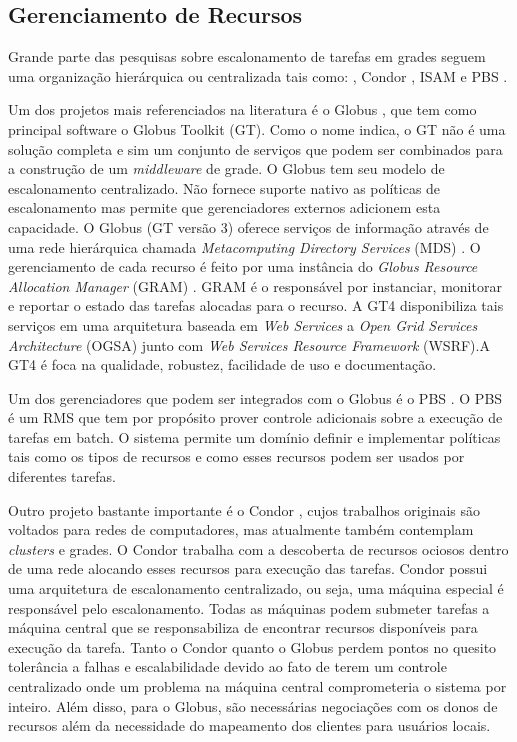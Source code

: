 \subsection{Gerenciamento de Recursos}
Grande parte das pesquisas sobre escalonamento de tarefas em grades seguem uma organização hierárquica ou centralizada tais como: \cite[Globus]{Foster1998}, Condor \cite{condor2007}, ISAM \cite{isam} e PBS \cite{Bayucan1998}.

Um dos projetos mais referenciados na literatura é o Globus \cite{Globus}, que tem como principal software o Globus Toolkit (GT). Como o nome indica, o GT não é uma solução completa e sim um conjunto de serviços que podem ser combinados para a construção de um \emph{middleware} de grade. O Globus \cite{Foster1998} tem seu modelo de escalonamento centralizado. Não fornece suporte nativo as políticas de escalonamento mas permite que gerenciadores externos adicionem esta capacidade. O Globus (GT versão 3) oferece serviços de informação através de uma rede hierárquica chamada \emph{Metacomputing Directory Services} (MDS) \cite{Santos}. O gerenciamento de cada recurso é feito por uma instância do {\it Globus Resource Allocation Manager} (GRAM) \cite{Andrade2002}. GRAM é o responsável por instanciar, monitorar e reportar o estado das tarefas alocadas para o recurso. A GT4 \cite{Leon2006} disponibiliza tais serviços em uma arquitetura baseada em {\it Web Services} a {\it Open Grid Services Architecture} (OGSA) junto com {\it Web Services Resource Framework} (WSRF).A GT4 é foca na qualidade, robustez, facilidade de uso e documentação.

Um dos gerenciadores que podem ser integrados com o Globus é o PBS \cite{Bayucan1998}. O PBS é um RMS que tem por propósito prover controle adicionais sobre a execução de tarefas em batch. O sistema permite um domínio definir e implementar políticas tais como os tipos de recursos e como esses recursos podem ser usados por diferentes tarefas.

Outro projeto bastante importante é o Condor \cite{condor2007}, cujos trabalhos originais são voltados para redes de computadores, mas atualmente também contemplam {\it clusters} e grades. O Condor trabalha com a descoberta de recursos ociosos dentro de uma rede alocando esses recursos para execução das tarefas. Condor possui uma arquitetura de escalonamento centralizado, ou seja, uma máquina especial é responsável pelo escalonamento. Todas as máquinas podem submeter tarefas a máquina central que se responsabiliza de encontrar recursos disponíveis para execução da tarefa. Tanto o Condor quanto o Globus perdem pontos no quesito tolerância a falhas e escalabilidade devido ao fato de terem um controle centralizado onde um problema na máquina central comprometeria o sistema por inteiro. Além disso, para o Globus, são necessárias negociações com os donos de recursos além da necessidade do mapeamento dos clientes para usuários locais.

